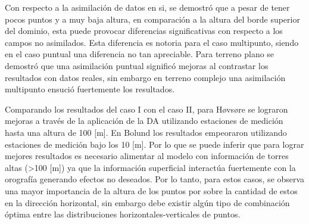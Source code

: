 \begin{itemize*}
	\item Con respecto a la asimilación de datos en si, se demostró que a pesar de tener pocos puntos y a muy baja altura, en comparación a la altura del borde superior del dominio, esta puede provocar diferencias significativas con respecto a los campos no asimilados. Esta diferencia es notoria para el caso multipunto, siendo en el caso puntual una diferencia no tan apreciable. Para terreno plano se demostró que una asimilación puntual significó mejoras al contrastar los resultados con datos reales, sin embargo en terreno complejo una asimilación multipunto ensució fuertemente los resultados.
	
	\item Comparando los resultados del caso I con el caso II, para Høvsøre se lograron mejoras a través de la aplicación de la DA utilizando estaciones de medición hasta una altura de 100 [m]. En Bolund los resultados empeoraron utilizando estaciones de medición bajo los 10 [m]. Por lo que se puede inferir que para lograr mejores resultados es necesario alimentar al modelo con información de torres altas (>100 [m]) ya que la información superficial interactúa fuertemente con la orografía generando efectos no deseados. Por lo tanto, para estos casos, se observa una mayor importancia de la altura de los puntos por sobre la cantidad de estos en la dirección horizontal, sin embargo debe existir algún tipo de combinación óptima entre las distribuciones horizontales-verticales de puntos.
	

\end{itemize*}
